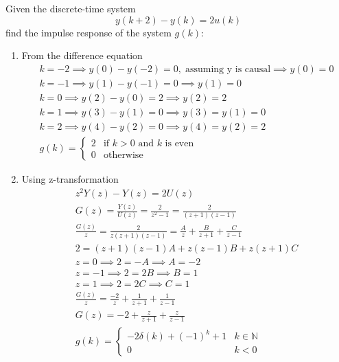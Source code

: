 \documentclass[12pt]{article}
\newcommand{\N}{\mathbb{N}}
\newenvironment{problem}[2][Problem]{\begin{trivlist}
\item[\hskip \labelsep {\bfseries #1}\hskip \labelsep {\bfseries #2.}]}{\end{trivlist}}
\begin{document}
\begin{problem}{3}
    Given the discrete-time system
    $$y(k+2)-y(k)=2u(k)$$
    find the impulse response of the system $g(k)$:
    \begin{enumerate}[label=\alph*.]
        \item From the difference equation
        \begin{align*}
            k = -2 \implies y(0) - y(-2) = 0,\;\text{assuming y is causal}\implies y(0) = 0\\
            k = -1 \implies y(1) - y(-1) = 0 \implies y(1) = 0\\
            k = 0 \implies y(2) - y(0) = 2 \implies y(2) = 2\\
            k = 1 \implies y(3) - y(1) = 0 \implies y(3) = y(1) = 0\\
            k = 2 \implies y(4) - y(2) = 0 \implies y(4) = y(2) = 2\\
            g(k) = \begin{cases}
                2 & \text{if $k > 0$ and $k$ is even}\\
                0 & \text{otherwise}
            \end{cases}
        \end{align*}
        \item Using z-transformation
        \begin{align*}
            z^2Y(z) - Y(z) = 2U(z)\\
            G(z) = \frac{Y(z)}{U(z)} = \frac{2}{z^2-1} = \frac{2}{(z+1)(z-1)}\\
            \frac{G(z)}{z} = \frac{2}{z(z+1)(z-1)} = \frac{A}{z}+\frac{B}{z+1}+\frac{C}{z-1}\\
            2=(z+1)(z-1)A + z(z-1)B + z(z+1)C\\
            z=0 \implies 2 = -A \implies A=-2\\
            z=-1 \implies 2 =2B \implies B=1\\
            z=1 \implies 2 = 2C \implies C=1\\
            \frac{G(z)}{z} = \frac{-2}{z} + \frac{1}{z+1}+\frac{1}{z-1}\\
            G(z) = -2 + \frac{z}{z+1} + \frac{z}{z-1}\\
            g(k) = \begin{cases}
                -2\delta(k) + (-1)^k + 1 & k\in \N\\
                0 & k < 0
            \end{cases} 
        \end{align*}
    \end{enumerate}
\end{problem}
\end{document}
